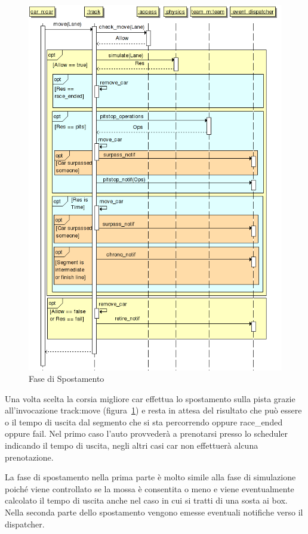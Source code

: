 \documentclass[11pt,a4paper]{report}
\begin{document}
\begin{figure}
\includegraphics[width=\textwidth]{diagrammi/Move}
\caption{Fase di Spostamento}
\label{fig:move}
\end{figure}

Una volta scelta la corsia migliore car effettua lo spostamento sulla pista grazie all'invocazione track:move (figura~\ref{fig:move}) e resta in attesa del risultato che può essere o il tempo di uscita dal segmento che si sta percorrendo oppure race\_ended oppure fail. Nel primo caso l'auto provvederà a prenotarsi presso lo scheduler indicando il tempo di uscita, negli altri casi car non effettuerà alcuna prenotazione.

La fase di spostamento nella prima parte è molto simile alla fase di simulazione poiché viene controllato se la mossa è consentita o meno e viene eventualmente calcolato il tempo di uscita anche nel caso in cui si tratti di una sosta ai box. Nella seconda parte dello spostamento vengono emesse eventuali notifiche verso il dispatcher.
\end{document}
